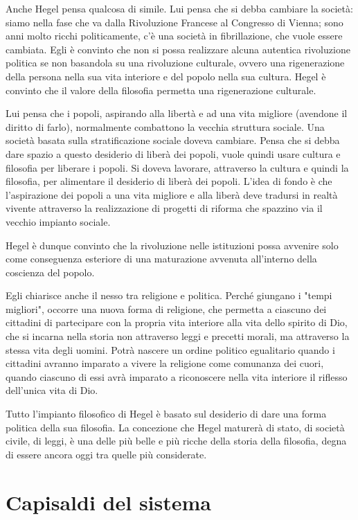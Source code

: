 \documentclass[a4paper, twoside, titlepage]{book}
\begin{document}
Anche Hegel pensa qualcosa di simile. Lui pensa che si debba cambiare la società: siamo nella fase che va dalla Rivoluzione Francese al Congresso di Vienna; sono anni molto ricchi politicamente, c'è una società in fibrillazione, che vuole essere cambiata. Egli è convinto che non si possa realizzare alcuna autentica rivoluzione politica se non basandola su una rivoluzione culturale, ovvero una rigenerazione della persona nella sua vita interiore e del popolo nella sua cultura. Hegel è convinto che il valore della filosofia permetta una rigenerazione culturale.

Lui pensa che i popoli, aspirando alla libertà e ad una vita migliore (avendone il diritto di farlo), normalmente combattono la vecchia struttura sociale. Una società basata sulla stratificazione sociale doveva cambiare. Pensa che si debba dare spazio a questo desiderio di liberà dei popoli, vuole quindi usare cultura e filosofia per liberare i popoli. Si doveva lavorare, attraverso la cultura e quindi la filosofia, per alimentare il desiderio di liberà dei popoli. L'idea di fondo è che l'aspirazione dei popoli a una vita migliore e alla liberà deve tradursi in realtà vivente attraverso la realizzazione di progetti di riforma che spazzino via il vecchio impianto sociale.

Hegel è dunque convinto che la rivoluzione nelle istituzioni possa avvenire solo come conseguenza esteriore di una maturazione avvenuta all'interno della coscienza del popolo.

Egli chiarisce anche il nesso tra religione e politica. Perché giungano i "tempi migliori", occorre una nuova forma di religione, che permetta a ciascuno dei cittadini di partecipare con la propria vita interiore alla vita dello spirito di Dio, che si incarna nella storia non attraverso leggi e precetti morali, ma attraverso la stessa vita degli uomini. Potrà nascere un ordine politico egualitario quando i cittadini avranno imparato a vivere la religione come comunanza dei cuori, quando ciascuno di essi avrà imparato a riconoscere nella vita interiore il riflesso dell'unica vita di Dio.

Tutto l'impianto filosofico di Hegel è basato sul desiderio di dare una forma politica della sua filosofia. La concezione che Hegel maturerà di stato, di società civile, di leggi, è una delle più belle e più ricche della storia della filosofia, degna di essere ancora oggi tra quelle più considerate.

\chapter{Capisaldi del sistema}
\end{document}
